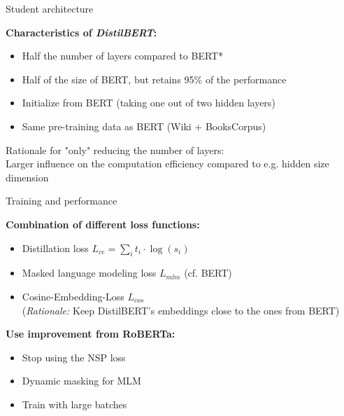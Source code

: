 
\begin{frame}{Student architecture}

\vfill

\textbf{Characteristics of \textit{DistilBERT}:}

\begin{itemize}
	\item Half the number of layers compared to BERT*
 	\item Half of the size of BERT, but retains 95\% of the performance
	\item Initialize from BERT (taking one out of two hidden layers)
	\item Same pre-training data as BERT (Wiki + BooksCorpus)
\end{itemize}

\vspace{1cm}

{\footnotesize *Rationale for "only" reducing the number of layers:\\
Larger influence on the computation efficiency compared to e.g. hidden size dimension}

\vfill

\end{frame}


\begin{frame}{Training and performance}

\vfill

\textbf{Combination of different loss functions:}

\begin{itemize}
	\item Distillation loss $L_{ce} = \sum_i t_i \cdot \log(s_i)$
	\item Masked language modeling loss $L_{mlm}$ (cf. BERT)
	\item Cosine-Embedding-Loss $L_{cos}$\\
				(\textit{Rationale:} Keep DistilBERT's embeddings close to the ones from BERT)
\end{itemize}

\vspace{.3cm}

\textbf{Use improvement from RoBERTa:}

\begin{itemize}
	\item Stop using the NSP loss
	\item Dynamic masking for MLM
	\item Train with large batches
\end{itemize}

\vfill

\end{frame}

